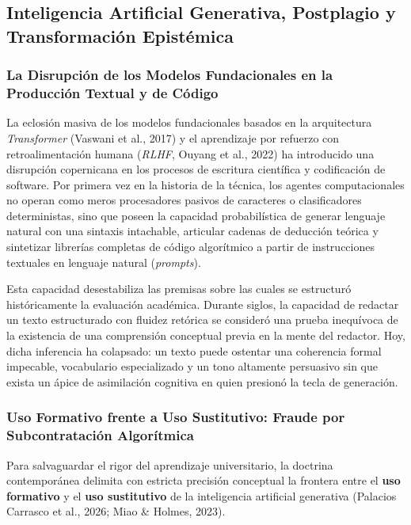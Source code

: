 \subsection{Inteligencia Artificial Generativa, Postplagio y Transformación Epistémica}

\subsubsection{La Disrupción de los Modelos Fundacionales en la Producción Textual y de Código}

La eclosión masiva de los modelos fundacionales basados en la arquitectura \textit{Transformer} (Vaswani et al., 2017) y el aprendizaje por refuerzo con retroalimentación humana (\textit{RLHF}, Ouyang et al., 2022) ha introducido una disrupción copernicana en los procesos de escritura científica y codificación de software. Por primera vez en la historia de la técnica, los agentes computacionales no operan como meros procesadores pasivos de caracteres o clasificadores deterministas, sino que poseen la capacidad probabilística de generar lenguaje natural con una sintaxis intachable, articular cadenas de deducción teórica y sintetizar librerías completas de código algorítmico a partir de instrucciones textuales en lenguaje natural (\textit{prompts}).

Esta capacidad desestabiliza las premisas sobre las cuales se estructuró históricamente la evaluación académica. Durante siglos, la capacidad de redactar un texto estructurado con fluidez retórica se consideró una prueba inequívoca de la existencia de una comprensión conceptual previa en la mente del redactor. Hoy, dicha inferencia ha colapsado: un texto puede ostentar una coherencia formal impecable, vocabulario especializado y un tono altamente persuasivo sin que exista un ápice de asimilación cognitiva en quien presionó la tecla de generación.

\subsubsection{Uso Formativo frente a Uso Sustitutivo: Fraude por Subcontratación Algorítmica}

Para salvaguardar el rigor del aprendizaje universitario, la doctrina contemporánea delimita con estricta precisión conceptual la frontera entre el \textbf{uso formativo} y el \textbf{uso sustitutivo} de la inteligencia artificial generativa (Palacios Carrasco et al., 2026; Miao \& Holmes, 2023).

